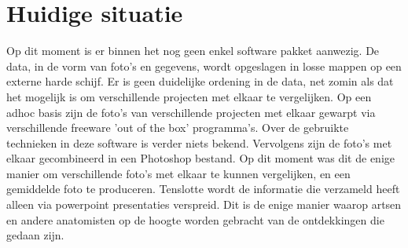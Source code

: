 \section{Huidige situatie}
\label{huidigesituatie}
Op dit moment is er binnen het \casamproject nog geen enkel software pakket aanwezig.
De data, in de vorm van foto's en gegevens, wordt opgeslagen in losse mappen op een externe harde schijf. 
Er is geen duidelijke ordening in de data, net zomin als dat het mogelijk is om verschillende projecten met elkaar te vergelijken.
Op een adhoc basis zijn de foto's van verschillende projecten met elkaar gewarpt via verschillende freeware 'out of the box' programma's. 
Over de gebruikte technieken in deze software is verder niets bekend. 
Vervolgens zijn de foto's met elkaar gecombineerd in een Photoshop bestand. Op dit moment was dit de enige manier om verschillende foto's met elkaar te kunnen vergelijken, en een gemiddelde foto te produceren.
Tenslotte wordt de informatie die \casam verzameld heeft alleen via powerpoint presentaties verspreid. 
Dit is de enige manier waarop artsen en andere anatomisten op de hoogte worden gebracht van de ontdekkingen die gedaan zijn.

